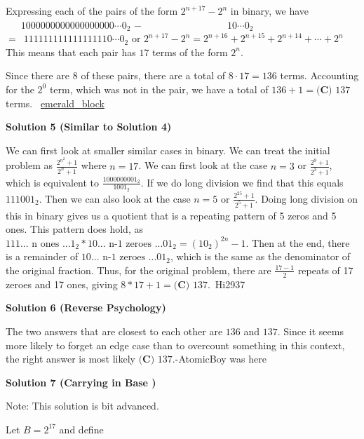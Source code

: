\begin{enumerate}
Expressing each of the pairs of the form $2^{n + 17} - 2^n$ in binary, we have 
$\phantom{=\ } 1000000000000000000 \cdots 0_2$
$-\ \phantom{10000000000000000} 10 \cdots 0_2$
$= \phantom{1} 111111111111111110 \cdots 0_2$ 
or 
$2^{n + 17} - 2^n = 2^{n + 16} + 2^{n + 15} + 2^{n + 14} + \cdots + 2^{n}$ 
This means that each pair has $17$ terms of the form $2^n$. 

Since there are $8$ of these pairs, there are a total of $8 \cdot 17 = 136$ terms. Accounting for the $2^0$ term, which was not in the pair, we have a total of $136 + 1 = \boxed{\textbf{(C) } 137}$ terms. ~\href{https://artofproblemsolving.com/wiki/index.php?title=User:Emerald\_block}{emerald\_block}

 



\textbf{Solution 5 (Similar to Solution 4)}

We can first look at smaller similar cases in binary. We can treat the initial problem as $\frac{2^{n^2} + 1}{2^n + 1}$ where $n=17$. We can first look at the case $n=3$ or $\frac{2^9 + 1}{2^3 + 1}$, which is equivalent to $\frac{1000000001_2}{1001_2}$. If we do long division we find that this equals $111001_2$. Then we can also look at the case $n=5$ or $\frac{2^{25}+1}{2^5+1}$. Doing long division on this in binary gives us a quotient that is a repeating pattern of 5 zeros and 5 ones. This pattern does hold, as $111\text{... n ones ...}1_2 * 10\text{... n-1 zeroes ...}01_2 = (10_2)^{2n} - 1$. Then at the end, there is a remainder of $10\text{... n-1 zeroes ...}01_2$, which is the same as the denominator of the original fraction. Thus, for the original problem, there are $\frac{17-1}{2}$ repeats of 17 zeroes and 17 ones, giving $8 * 17 + 1 = \boxed{\textbf{(C) }137}$.~Hi2937

 



\textbf{Solution 6 (Reverse Psychology)}

The two answers that are closest to each other are $136$ and $137$. Since it seems more likely to forget an edge case than to overcount something in this context, the right answer is most likely $\boxed{\textbf{(C) }137}$.-AtomicBoy was here

 



\textbf{Solution 7 (Carrying in Base )}

Note: This solution is bit advanced.

 Let $B=2^{17}$ and define


\end{enumerate}
